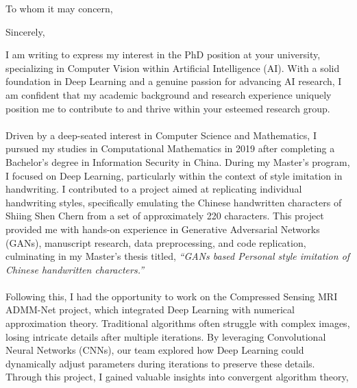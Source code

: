 \documentclass[11pt,a4paper, final]{moderncv}
\begin{document}
\date{\today}
\opening{To whom it may concern,}
\closing{Sincerely,}
\makelettertitle
I am writing to express my interest in the PhD position at your university, 
specializing in Computer Vision within Artificial Intelligence (AI). 
With a solid foundation in Deep Learning and a genuine passion for advancing AI research, 
I am confident that my academic background and research experience uniquely position me 
to contribute to and thrive within your esteemed research group. 
\ \\
\ \\
Driven by a deep-seated interest in Computer Science and Mathematics, 
I pursued my studies in Computational Mathematics in 2019 
after completing a Bachelor's degree in Information Security in China. 
During my Master's program, I focused on Deep Learning, 
particularly within the context of style imitation in handwriting. 
I contributed to a project aimed at replicating individual handwriting styles, 
specifically emulating the Chinese handwritten characters of Shiing Shen Chern from a set of approximately 220 characters. 
This project provided me with hands-on experience in Generative Adversarial Networks (GANs), 
manuscript research, data preprocessing, and code replication, 
culminating in my Master's thesis titled, \emph{“GANs based Personal style imitation of Chinese handwritten characters.”}
\ \\
\ \\
Following this, I had the opportunity to work on the Compressed Sensing MRI ADMM-Net project, 
which integrated Deep Learning with numerical approximation theory. 
Traditional algorithms often struggle with complex images, losing intricate details after multiple iterations. 
By leveraging Convolutional Neural Networks (CNNs), 
our team explored how Deep Learning could dynamically adjust parameters during iterations to preserve these details. 
Through this project, I gained valuable insights into convergent algorithm theory, 
\end{document}
